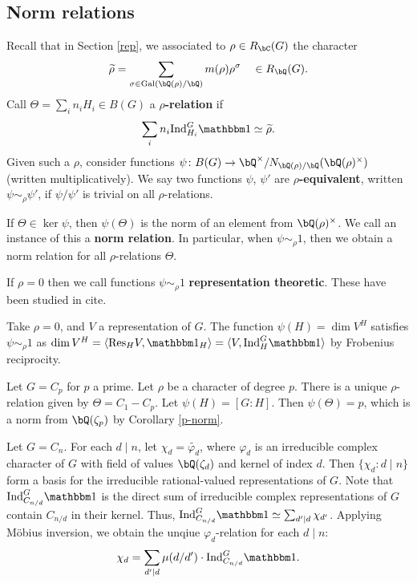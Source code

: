 \subsection{Norm relations}

Recall that in Section \ref{rep}, we associated to $\rho \in R_{\bC}(G)$ the character
    \[ \widetilde{\rho} = \sum_{\sigma \in \Gal(\bQ(\rho) / \bQ)} m(\rho) \rho^{\sigma} \quad \in R_{\bQ}(G) .\]
 Call $\Theta = \sum_i n_i H_i \in B(G)$ a \textbf{$\rho$-relation} if 
    \[ \sum_i n_i \Ind_{H_i}^G \trivial \simeq \widetilde{\rho}. \]
Given such a $\rho$, consider functions $\psi \colon B(G) \to \bQ^{\times} / N_{\bQ(\rho) / \bQ}(\bQ(\rho)^\times)$ (written multiplicatively). We say two functions $\psi$, $\psi'$ are \textbf{$\rho$-equivalent}, written $\psi \sim_{\rho} \psi'$, if $\psi / \psi'$ is trivial on all $\rho$-relations. 

If $\Theta \in \ker \psi$, then $\psi(\Theta)$ is the norm of an element from $\bQ(\rho)^{\times}$. We call an instance of this a \textbf{norm relation}.
In particular, when $\psi \sim_{\rho} 1$, then we obtain a norm relation for all $\rho$-relations $\Theta$. 

\begin{rem}
    If $\rho = 0$ then we call functions $\psi \sim_{\rho} 1$ \textbf{representation theoretic}. These have been studied in {\color{red} cite}.
\end{rem}

\begin{example}
  Take $\rho = 0$, and $V$ a representation of $G$. The function $\psi(H) = \dim V^H$ satisfies $\psi \sim_{\rho} 1$ as $\dim V^H = \langle \Res_{H} V , \trivial_H \rangle = \langle V, \Ind_{H}^G \trivial \rangle$ by Frobenius reciprocity.
\end{example}

\begin{example}
    Let $G = C_p$ for $p$ a prime. Let $\rho$ be a character of degree $p$. There is a unique $\rho$-relation given by $\Theta = C_1 - C_p$. Let $\psi(H) = [G \colon H]$. Then $\psi(\Theta) = p$, which is a norm from $\bQ(\zeta_p)$ by Corollary \ref{p-norm}. 
\end{example}

\begin{example}\label{cyclic-relns}
Let $G = C_n$. For each $d \mid n$, let $\chi_d = \widetilde{\varphi_d}$, where $\varphi_d$ is an irreducible complex character of $G$ with field of values $\bQ(\zeta_d)$ and kernel of index $d$.
Then $\{ \chi_d \colon d\mid n \}$ form a basis for the irreducible rational-valued representations of $G$. Note that $\Ind_{C_{n/ d}}^G \trivial$ is the direct sum of irreducible complex representations of $G$ contain $C_{n / d}$ in their kernel. Thus, $\Ind_{C_{n/ d}}^G \trivial \simeq \sum_{d' \mid d} \chi_{d'}$. Applying M\"{o}bius inversion, we obtain the unqiue $\varphi_d$-relation for each $d \mid n$:
\[ \chi_d = \sum_{d' \mid d} \mu(d / d') \cdot \Ind_{C_{n/ d}}^G \trivial. \]
\end{example}


